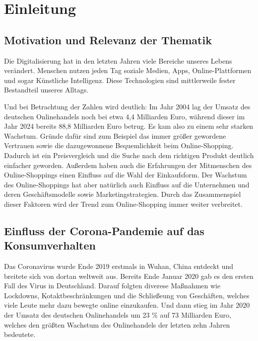 \section{Einleitung}
\subsection{Motivation und Relevanz der Thematik}
Die Digitalisierung hat in den letzten Jahren viele Bereiche unseres Lebens verändert. Menschen nutzen jeden Tag soziale Medien, Apps, Online-Plattformen und sogar Künstliche Intelligenz. Diese Technologien sind mittlerweile fester Bestandteil unseres Alltags. 

Und bei Betrachtung der Zahlen wird deutlich: Im Jahr 2004 lag der Umsatz des deutschen Onlinehandels noch bei etwa 4,4 Milliarden Euro, während dieser im Jahr 2024 bereits 88,8 Milliarden Euro betrug. Es kam also zu einem sehr starken Wachstum. Gründe dafür sind zum Beispiel das immer größer gewordene Vertrauen sowie die dazugewonnene Bequemlichkeit beim Online-Shopping. Dadurch ist ein Preisvergleich und die Suche nach dem richtigen Produkt deutlich einfacher geworden. Außerdem haben auch die Erfahrungen der Mitmenschen des Online-Shoppings einen Einfluss auf die Wahl der Einkaufsform. Der Wachstum des Online-Shoppings hat aber natürlich auch Einfluss auf die Unternehmen und deren Geschäftsmodelle sowie Marketingstrategien. Durch das Zusammenspiel dieser Faktoren wird der Trend zum Online-Shopping immer weiter verbreitet. 

\subsection{Einfluss der Corona-Pandemie auf das Konsumverhalten}
Das Coronavirus wurde Ende 2019 erstmals in Wuhan, China entdeckt und breitete sich von dortan weltweit aus. Bereits Ende Januar 2020 gab es den ersten Fall des Virus in Deutschland. Darauf folgten diverese Maßnahmen wie Lockdowns, Kotaktbeschränkungen und die Schließeung von Geschäften, welches viele Leute mehr dazu bewegte online einzukaufen. Und dann stieg im Jahr 2020 der Umsatz des deutschen Onlinehandels um 23 \% auf 73 Milliarden Euro, welches den größten Wachstum des Onlinehandels der letzten zehn Jahren bedeutete. 

